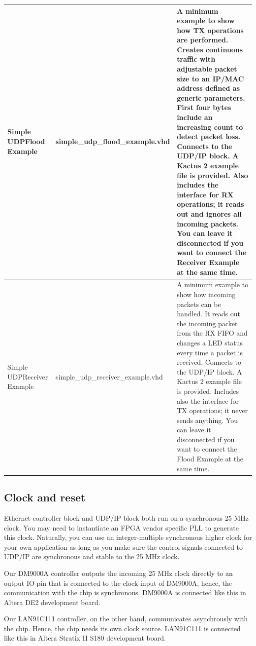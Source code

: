 \documentclass[a4paper,10pt,oneside,final]{article}
\begin{document}
\begin{center}
\begin{tabular}{ | p{3cm} | p{5cm} | p{6cm} | }
    \hline
    Simple UDP\newline Flood Example & simple\_udp\_\newline flood\_example.vhd & 
    A minimum example to show how TX operations are performed. Creates continuous traffic with
    adjustable packet size to an IP/MAC address defined as generic parameters. First four bytes include an increasing count to detect packet loss.
    Connects to the UDP/IP block. A Kactus 2 example file is provided. Also includes the interface for RX operations; it reads out and ignores all incoming
    packets. You can leave it disconnected if you want to connect the Receiver Example at the same time. \\
    \hline
    Simple UDP\newline Receiver Example & simple\_udp\_\newline receiver\_example.vhd & 
    A minimum example to show how incoming packets can be handled. It reads out the
    incoming packet from the RX FIFO and changes a LED status every time a packet is received.    
    Connects to the UDP/IP block. A Kactus 2 example file is provided. Includes also the interface for TX operations; it never sends anything. You can
    leave it disconnected if you want to connect the Flood Example at the same time. \\
    \hline
  \end{tabular}
\end{center}


\subsection{Clock and reset}

Ethernet controller block and UDP/IP block both run on a synchronous
25 MHz clock. You may need to instantiate an FPGA vendor specific PLL
to generate this clock. Naturally, you can use an integer-multiple
synchronous higher clock for your own application as long as you
make sure the control signals connected to UDP/IP are synchronous and
stable to the 25 MHz clock.

Our DM9000A controller outputs the incoming 25 MHz clock directly to an
output IO pin that is connected to the clock input of DM9000A, hence,
the communication with the chip is synchronous. DM9000A is connected
like this in Altera DE2 development board.

Our LAN91C111 controller, on the other hand, communicates asynchrously
with the chip. Hence, the chip needs its own clock source. LAN91C111 is
connected like this in Altera Stratix II S180 development board.
\end{document}
